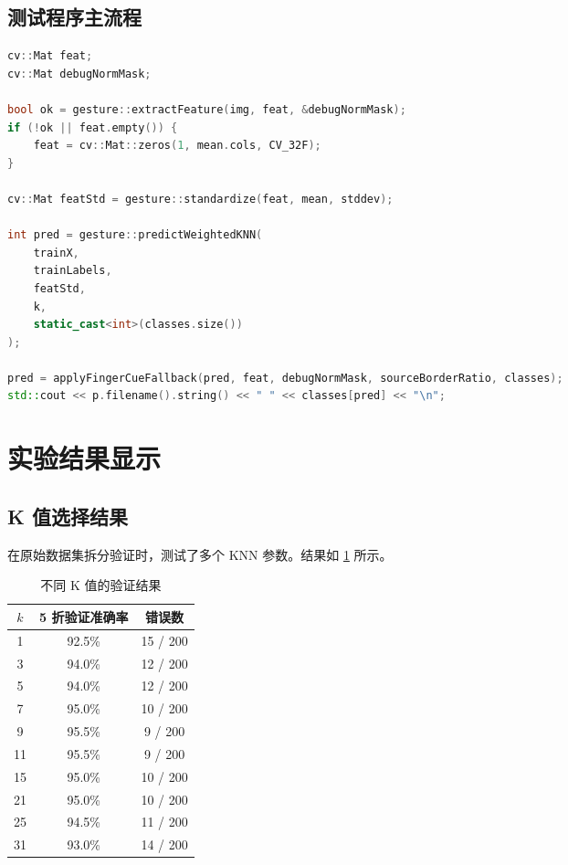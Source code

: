 \documentclass[11pt]{article}
\begin{document}
\subsection{测试程序主流程}

\begin{lstlisting}[language=C++,caption={测试阶段核心流程}]
cv::Mat feat;
cv::Mat debugNormMask;

bool ok = gesture::extractFeature(img, feat, &debugNormMask);
if (!ok || feat.empty()) {
    feat = cv::Mat::zeros(1, mean.cols, CV_32F);
}

cv::Mat featStd = gesture::standardize(feat, mean, stddev);

int pred = gesture::predictWeightedKNN(
    trainX,
    trainLabels,
    featStd,
    k,
    static_cast<int>(classes.size())
);

pred = applyFingerCueFallback(pred, feat, debugNormMask, sourceBorderRatio, classes);
std::cout << p.filename().string() << " " << classes[pred] << "\n";
\end{lstlisting}

\section{实验结果显示}

\subsection{K 值选择结果}

在原始数据集拆分验证时，测试了多个 KNN 参数。结果如 \cref{tab:k} 所示。

\begin{table}[H]
\centering
\caption{不同 K 值的验证结果}
\label{tab:k}
\begin{tabular}{ccc}
\toprule
$k$ & 5 折验证准确率 & 错误数 \\
\midrule
1 & 92.5\% & 15 / 200 \\
3 & 94.0\% & 12 / 200 \\
5 & 94.0\% & 12 / 200 \\
7 & 95.0\% & 10 / 200 \\
9 & 95.5\% & 9 / 200 \\
11 & 95.5\% & 9 / 200 \\
15 & 95.0\% & 10 / 200 \\
21 & 95.0\% & 10 / 200 \\
25 & 94.5\% & 11 / 200 \\
31 & 93.0\% & 14 / 200 \\
\bottomrule
\end{tabular}
\end{table}
\end{document}
